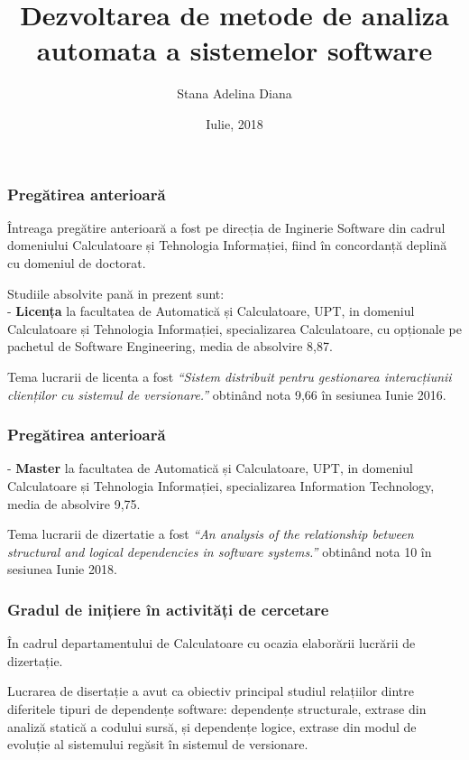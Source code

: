 \documentclass{beamer}
\title[Pres]{Dezvoltarea de metode de analiza automata a sistemelor software}
\author{Stana Adelina Diana}
\institute{Computer Science and Engineering Department\\
"Politehnica" University of Timisoara}
\date{Iulie, 2018}
\begin{document}
\begin{frame}
  \titlepage
\end{frame}



 \begin{frame}
\frametitle{Pregătirea anterioară}
\begin{block}{}
Întreaga pregătire anterioară a fost pe direcția de Inginerie Software din cadrul domeniului Calculatoare și Tehnologia Informației, fiind în concordanță deplină cu domeniul de doctorat.
\end{block}

Studiile absolvite pană in prezent sunt:\\
- \textbf{Licența} la facultatea de Automatică și Calculatoare, UPT, in domeniul Calculatoare și Tehnologia Informației, specializarea Calculatoare, cu opționale pe pachetul de Software Engineering, media de absolvire 8,87.

Tema lucrarii de licenta a fost \textit{“Sistem distribuit pentru gestionarea interacțiunii clienților cu sistemul de versionare.”} obtinând nota 9,66  în sesiunea Iunie 2016.

\end{frame}


 \begin{frame}
\frametitle{Pregătirea anterioară}

- \textbf{Master} la facultatea de Automatică și Calculatoare, UPT, in domeniul Calculatoare și Tehnologia Informației, specializarea Information Technology, media de absolvire 9,75. 

Tema lucrarii de dizertatie a fost \textit{“An analysis of the relationship between structural and logical dependencies in software systems.”} obtinând nota 10 în sesiunea Iunie 2018.

\end{frame}



 \begin{frame}
\frametitle{Gradul de inițiere în activități de cercetare}
\begin{block}{}
În cadrul departamentului de Calculatoare cu ocazia elaborării lucrării de dizertație. 
\end{block}

Lucrarea de disertație a avut ca obiectiv principal studiul relațiilor dintre diferitele tipuri de dependențe software: dependențe structurale, extrase din analiză statică a codului sursă, și dependențe logice, extrase din modul de evoluție al sistemului regăsit  în sistemul de versionare. 
\end{frame}
\end{document}
